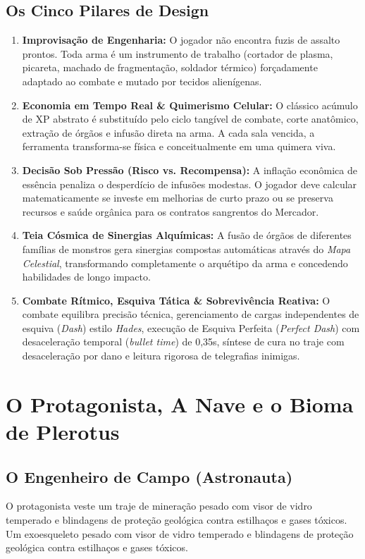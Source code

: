 \documentclass[a4paper,12pt]{report}
\begin{document}
\section{Os Cinco Pilares de Design}
\begin{enumerate}
    \item \textbf{Improvisação de Engenharia:} O jogador não encontra fuzis de assalto prontos. Toda arma é um instrumento de trabalho (cortador de plasma, picareta, machado de fragmentação, soldador térmico) forçadamente adaptado ao combate e mutado por tecidos alienígenas.
    \item \textbf{Economia em Tempo Real \& Quimerismo Celular:} O clássico acúmulo de XP abstrato é substituído pelo ciclo tangível de combate, corte anatômico, extração de órgãos e infusão direta na arma. A cada sala vencida, a ferramenta transforma-se física e conceitualmente em uma quimera viva.
    \item \textbf{Decisão Sob Pressão (Risco vs. Recompensa):} A inflação econômica de essência penaliza o desperdício de infusões modestas. O jogador deve calcular matematicamente se investe em melhorias de curto prazo ou se preserva recursos e saúde orgânica para os contratos sangrentos do Mercador.
    \item \textbf{Teia Cósmica de Sinergias Alquímicas:} A fusão de órgãos de diferentes famílias de monstros gera sinergias compostas automáticas através do \textit{Mapa Celestial}, transformando completamente o arquétipo da arma e concedendo habilidades de longo impacto.
    \item \textbf{Combate Rítmico, Esquiva Tática \& Sobrevivência Reativa:} O combate equilibra precisão técnica, gerenciamento de cargas independentes de esquiva (\textit{Dash}) estilo \textit{Hades}, execução de Esquiva Perfeita (\textit{Perfect Dash}) com desaceleração temporal (\textit{bullet time}) de 0,35s, síntese de cura no traje com desaceleração por dano e leitura rigorosa de telegrafias inimigas.
\end{enumerate}

\chapter{O Protagonista, A Nave e o Bioma de Plerotus}

\section{O Engenheiro de Campo (Astronauta)}
O protagonista veste um traje de mineração pesado com visor de vidro temperado e blindagens de proteção geológica contra estilhaços e gases tóxicos. Um exoesqueleto pesado com visor de vidro temperado e blindagens de proteção geológica contra estilhaços e gases tóxicos.
\end{document}
